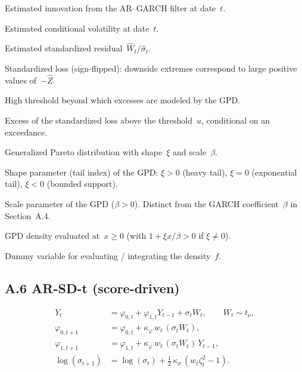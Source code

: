 \begin{description}[style=nextline,leftmargin=2.2cm,labelwidth=2cm]
  \item[$\hat{W}_t$]
    Estimated innovation from the AR--GARCH filter at date~$t$.
  \item[$\hat{\sigma}_t$]
    Estimated conditional volatility at date~$t$.
  \item[$\hat{Z}_t$]
    Estimated standardized residual~$\hat{W}_t / \hat{\sigma}_t$.
  \item[$-\hat{Z}$]
    Standardized loss (sign-flipped): downside extremes correspond to large positive values of~$-\hat{Z}$.
  \item[$u$]
    High threshold beyond which excesses are modeled by the GPD.
  \item[$X$]
    Excess of the standardized loss above the threshold~$u$, conditional on an exceedance.
  \item[$\mathrm{GPD}(\xi,\beta)$]
    Generalized Pareto distribution with shape~$\xi$ and scale~$\beta$.
  \item[$\xi$]
    Shape parameter (tail index) of the GPD:
    $\xi > 0$ (heavy tail), $\xi = 0$ (exponential tail), $\xi < 0$ (bounded support).
  \item[$\beta$]
    Scale parameter of the GPD ($\beta > 0$).
    Distinct from the GARCH coefficient~$\beta$ in Section~A.4.
  \item[$f(x)$]
    GPD density evaluated at~$x \geq 0$ (with $1 + \xi x / \beta > 0$ if $\xi \neq 0$).
  \item[$x$]
    Dummy variable for evaluating / integrating the density~$f$.
\end{description}

\subsection*{A.6 AR-SD-t (score-driven)}

\begin{align*}
  Y_t &= \varphi_{0,t} + \varphi_{1,t} Y_{t-1} + \sigma_t W_t,
  \qquad W_t \sim t_{\nu}, \\
  \varphi_{0,t+1} &= \varphi_{0,t} + \kappa_{\varphi}\, w_t\,(\sigma_t W_t), \\
  \varphi_{1,t+1} &= \varphi_{1,t} + \kappa_{\varphi}\, w_t\,(\sigma_t W_t)\, Y_{t-1}, \\
  \log(\sigma_{t+1}) &= \log(\sigma_t) + \tfrac{1}{2}\,\kappa_{\sigma}\,(w_t \zeta_t^2 - 1).
\end{align*}

